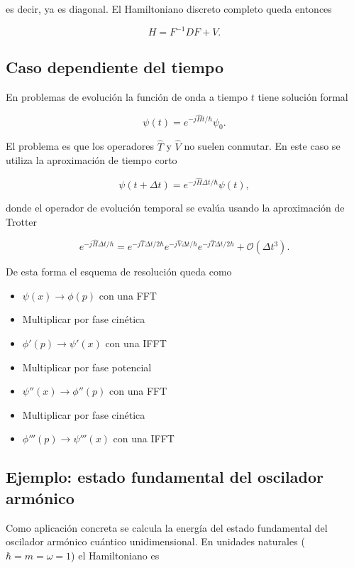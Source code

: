 \documentclass[11pt,a4paper,twoside,pdf]{article}
\numberwithin{equation}{section}
\begin{document}
es decir, ya es diagonal. El Hamiltoniano discreto completo queda entonces

\begin{equation}
H = F^{-1} D F + V.
\end{equation}


\subsection{Caso dependiente del tiempo}


En problemas de evolución la función de onda a tiempo $t$ tiene solución formal

$$
    \psi(t) = e^{-j\hat{H}t/\hbar} \psi_0.
$$


El problema es que los operadores $\hat{T}$ y $\hat{V}$ no suelen conmutar. En este caso se utiliza la aproximación de tiempo corto

$$
    \psi(t + \Delta t) = e^{-j\hat{H}\Delta t/\hbar} \psi(t),
$$


donde el operador de evolución temporal se evalúa usando la aproximación de Trotter \cite{kalos2008monte}

$$
    e^{-j\hat{H}\Delta t/\hbar} = e^{-j\hat{T}\Delta t/2\hbar} e^{-j\hat{V}\Delta t/\hbar} e^{-j\hat{T}\Delta t/ 2\hbar} + \mathcal{O} (\Delta t^3).
$$


De esta forma el esquema de resolución queda como

\begin{itemize}
    \item [1.] $\psi(x) \to \phi(p)$ con una FFT
    \item [2.] Multiplicar por fase cinética
    \item [3.] $\phi'(p) \to \psi'(x)$ con una IFFT
    \item [4.] Multiplicar por fase potencial
    \item [5.] $\psi''(x) \to \phi''(p)$ con una FFT
    \item [6.] Multiplicar por fase cinética
    \item [7.] $\phi'''(p) \to \psi'''(x)$ con una IFFT
\end{itemize}


\subsection{Ejemplo: estado fundamental del oscilador armónico}

Como aplicación concreta se calcula la energía del estado fundamental del oscilador armónico cuántico unidimensional. En unidades naturales ($\hbar = m = \omega = 1$) el Hamiltoniano es
\end{document}
